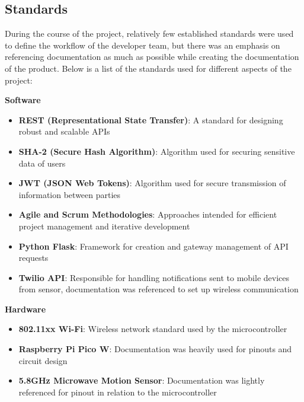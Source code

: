 \subsection{Standards}\label{subsec:standards}

During the course of the project, relatively few established standards were used to
define the workflow of the developer team, but there was an emphasis on referencing
documentation as much as possible while creating the documentation of the product. %
Below is a list of the standards used for different aspects of the project:

\textbf{Software}
\begin{itemize}
    \item \textbf{REST (Representational State Transfer)}: A standard for designing
          robust and scalable APIs
    \item \textbf{SHA-2 (Secure Hash Algorithm)}: Algorithm used for securing
          sensitive data of users
    \item \textbf{JWT (JSON Web Tokens)}: Algorithm used for secure transmission of
          information between parties
    \item \textbf{Agile and Scrum Methodologies}: Approaches intended for efficient
          project management and iterative development
    \item \textbf{Python Flask}: Framework for creation and gateway management of API
          requests
    \item \textbf{Twilio API}: Responsible for handling notifications sent to mobile
          devices from sensor, documentation was referenced to set up wireless communication
\end{itemize}

\textbf{Hardware}
\begin{itemize}
    \item \textbf{802.11xx Wi-Fi}: Wireless network standard used by the
          microcontroller
    \item \textbf{Raspberry Pi Pico W}: Documentation was heavily used for pinouts
          and circuit design~\cite{picoW_docs2016}
    \item \textbf{5.8GHz Microwave Motion Sensor}: Documentation was lightly
          referenced for pinout in relation to the microcontroller~\cite{CQRobot_specs2016}
\end{itemize}